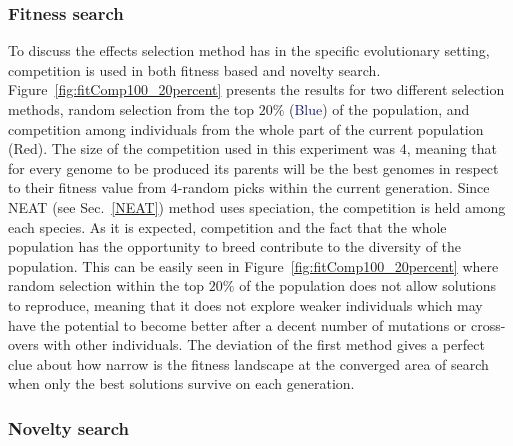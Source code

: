 \subsubsection*{Fitness search}

To discuss the effects selection method has in the specific evolutionary setting, competition is used in both fitness based and novelty search. Figure~\ref{fig:fitComp100_20percent} presents the results for two different selection methods, random selection from the top $20\%$ (\textcolor{MidnightBlue}{Blue}) of the population, and competition among individuals from the whole part of the current population (\textcolor{BrickRed}{Red}). The size of the competition used in this experiment was $4$, meaning that for every genome to be produced its parents will be the best genomes in respect to their fitness value from $4$-random picks within the current generation. Since NEAT (see Sec.~\ref{NEAT}) method uses speciation, the competition is held among each species. As it is expected, competition and the fact that the whole population has the opportunity to breed contribute to the diversity of the population. This can be easily seen in Figure~\ref{fig:fitComp100_20percent} where random selection within the top $20\%$ of the population does not allow solutions to reproduce, meaning that it does not explore weaker individuals which may have the potential to become better after a decent number of mutations or cross-overs with other individuals. The deviation of the first method gives a perfect clue about how narrow is the fitness landscape at the converged area of search when only the best solutions survive on each generation.

\subsubsection*{Novelty search}

